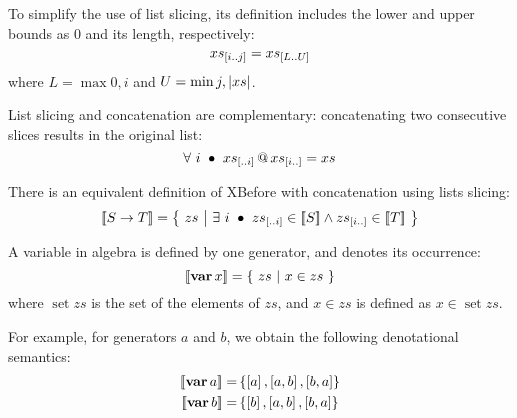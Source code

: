 To simplify the use of list slicing, its definition includes the lower and upper bounds as $0$ and its length, respectively:
%
\begin{equation}
xs_{\left[i..j\right]} = xs_{\left[L..U\right]}
\end{equation}
%
where $L = \max{0,i}$ and $U = \min{j,\ensuremath\left|xs\right|}$.

List slicing and concatenation are complementary: concatenating two consecutive slices results in the original list:
\begin{equation}
\label{law:slice-append}
\forall~ i ~\bullet~ xs_{\left[..i\right]} \operatorname{\mathbf{@}} xs_{\left[i..\right]} = xs
\end{equation}

There is an equivalent definition of \ac{XBefore} with concatenation using lists slicing:
%
\begin{equation}
\label{def:xbefore-slice}
\left[\!\left[S \rightarrow T\right]\!\right] =
  \left\{~
    zs ~\middle|~ \exists~ i ~\bullet~ zs_{\left[..i\right]} \in \left[\!\left[S\right]\!\right] \land zs_{\left[i..\right]} \in \left[\!\left[T\right]\!\right]
  ~\right\}
\end{equation}

A variable in \ac{algebra} is defined by one generator, and denotes its occurrence:
%
\begin{equation}
\label{def:var}
\left[\!\left[\operatorname{\mathbf{var}} x\right]\!\right] =
  \left\{~
    zs ~\middle|~ x \in zs
  ~\right\}
\end{equation}
%
where $\mathop{set}zs$ is the set of the elements of $zs$, and $x \in zs$ is defined as $x \in \mathop{set} zs$.

For example, for generators $a$ and $b$, we obtain the following denotational semantics:
%
\begin{subequations}
\begin{align}
\denote{\var{a}} = & \left\{\listsin{a}, \listsin{a,b}, \listsin{b,a}\right\}\label{eq:denotational-var-a}\\
%
\denote{\var{b}} = & \left\{\listsin{b}, \listsin{a,b}, \listsin{b,a}\right\}\label{eq:denotational-var-b}
\end{align}
\end{subequations}

